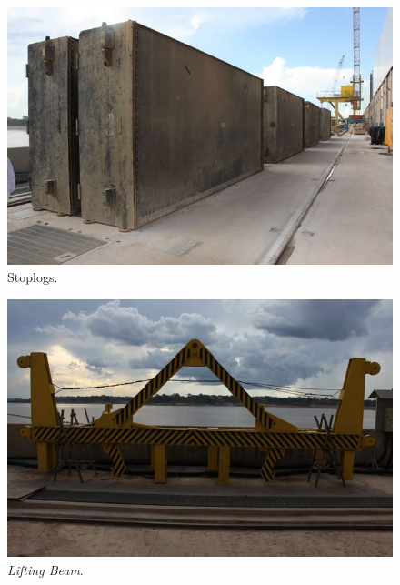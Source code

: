 \begin{figure}[H]
    \centering
    \includegraphics[width=1\columnwidth]{figs/nomenclatura/1.jpg}
    \caption{Stoplogs.}
    \label{nomenclatura_1}
\end{figure}

\begin{figure}[H]
    \centering
    \includegraphics[width=1\columnwidth]{figs/nomenclatura/2.jpg}
    \caption{\emph{Lifting Beam}.}
    \label{nomenclatura_2}
\end{figure}


